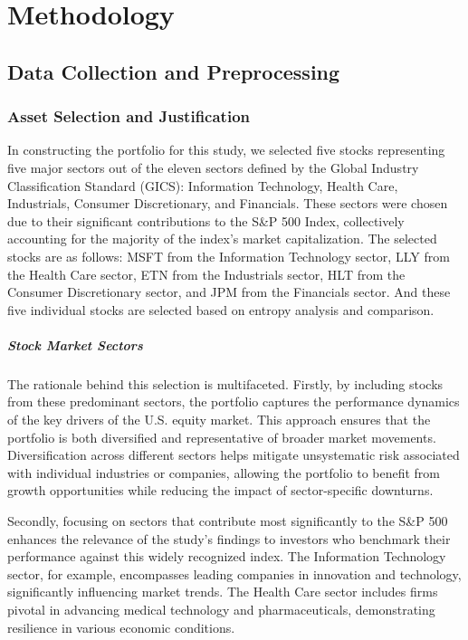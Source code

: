 
\chapter{Methodology}\label{chapter:methodology}

\section{Data Collection and Preprocessing}

\subsection{Asset Selection and Justification}


In constructing the portfolio for this study, we selected five stocks representing five major sectors out of the eleven sectors defined by the Global Industry Classification Standard (GICS): Information Technology, Health Care, Industrials, Consumer Discretionary, and Financials. These sectors were chosen due to their significant contributions to the S\&P 500 Index, collectively accounting for the majority of the index's market capitalization. The selected stocks are as follows: \ac{MSFT} from the Information Technology sector, \ac{LLY} from the Health Care sector, \ac{ETN} from the Industrials sector, \ac{HLT} from the Consumer Discretionary sector, and \ac{JPM} from the Financials sector. And these five individual stocks are selected based on entropy analysis and comparison.

\paragraph{Stock Market Sectors}
The rationale behind this selection is multifaceted. Firstly, by including stocks from these predominant sectors, the portfolio captures the performance dynamics of the key drivers of the U.S. equity market. This approach ensures that the portfolio is both diversified and representative of broader market movements. Diversification across different sectors helps mitigate unsystematic risk associated with individual industries or companies, allowing the portfolio to benefit from growth opportunities while reducing the impact of sector-specific downturns.

Secondly, focusing on sectors that contribute most significantly to the S\&P 500 enhances the relevance of the study's findings to investors who benchmark their performance against this widely recognized index. The Information Technology sector, for example, encompasses leading companies in innovation and technology, significantly influencing market trends. The Health Care sector includes firms pivotal in advancing medical technology and pharmaceuticals, demonstrating resilience in various economic conditions.

